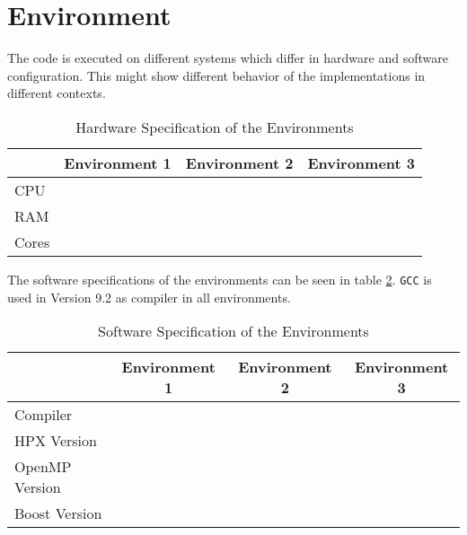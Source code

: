 \section{Environment}
  The code is executed on different systems which differ in hardware and software configuration.
  This might show different behavior of the implementations in different contexts.

\begin{table}
\centering
\caption{Hardware Specification of the Environments}
\begin{tabular}[h]{l c c c}
 & Environment 1 & Environment 2 & Environment 3 \\\hline
CPU &  &  &  \\
RAM &  &  &  \\
Cores &  &  &  \\\hline
\end{tabular}
\label{tab:hardEnv}
\end{table}

The software specifications of the environments can be seen in table \ref{tab:softEnv}.
\texttt{GCC} is used in Version 9.2 as compiler in all environments.
\begin{table}
\centering
\caption{Software Specification of the Environments}
\begin{tabular}[h]{l c c c}
\centering
 & Environment 1 & Environment 2 & Environment 3 \\\hline
Compiler &  &  &  \\
HPX Version &  &  &  \\
OpenMP Version &  &  &  \\
Boost Version &  &  &  \\\hline
\end{tabular}
\label{tab:softEnv}
\end{table}
